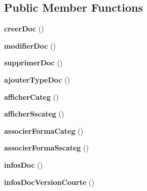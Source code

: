 \subsection*{Public Member Functions}
\begin{DoxyCompactItemize}
\item 
\hypertarget{class_documentation_ad542420adb8667c34c7a6b79dd757062}{
{\bfseries creerDoc} ()}
\label{class_documentation_ad542420adb8667c34c7a6b79dd757062}

\item 
\hypertarget{class_documentation_a878be8658455924ad02da60b450a09c1}{
{\bfseries modifierDoc} ()}
\label{class_documentation_a878be8658455924ad02da60b450a09c1}

\item 
\hypertarget{class_documentation_a106da194d38484a410f9899a450d0bd5}{
{\bfseries supprimerDoc} ()}
\label{class_documentation_a106da194d38484a410f9899a450d0bd5}

\item 
\hypertarget{class_documentation_a3440f2c65738dbb8f2b8eadbe3956278}{
{\bfseries ajouterTypeDoc} ()}
\label{class_documentation_a3440f2c65738dbb8f2b8eadbe3956278}

\item 
\hypertarget{class_documentation_a8eb9b78e1926834a9d0896184a80e771}{
{\bfseries afficherCateg} ()}
\label{class_documentation_a8eb9b78e1926834a9d0896184a80e771}

\item 
\hypertarget{class_documentation_a838c98cf3a5b46642c7e253e234feeb6}{
{\bfseries afficherSscateg} ()}
\label{class_documentation_a838c98cf3a5b46642c7e253e234feeb6}

\item 
\hypertarget{class_documentation_affd129a3ba30faa4b7e78266d66e15a2}{
{\bfseries associerFormaCateg} ()}
\label{class_documentation_affd129a3ba30faa4b7e78266d66e15a2}

\item 
\hypertarget{class_documentation_a636a2fa7e80351e71a5f1329f9cfd19e}{
{\bfseries associerFormaSscateg} ()}
\label{class_documentation_a636a2fa7e80351e71a5f1329f9cfd19e}

\item 
\hypertarget{class_documentation_ae14f314f0d07bd6d7301028ff86f0016}{
{\bfseries infosDoc} ()}
\label{class_documentation_ae14f314f0d07bd6d7301028ff86f0016}

\item 
\hypertarget{class_documentation_ac04af1165e6d6918c9c38485bf1fa814}{
{\bfseries infosDocVersionCourte} ()}
\label{class_documentation_ac04af1165e6d6918c9c38485bf1fa814}

\end{DoxyCompactItemize}
